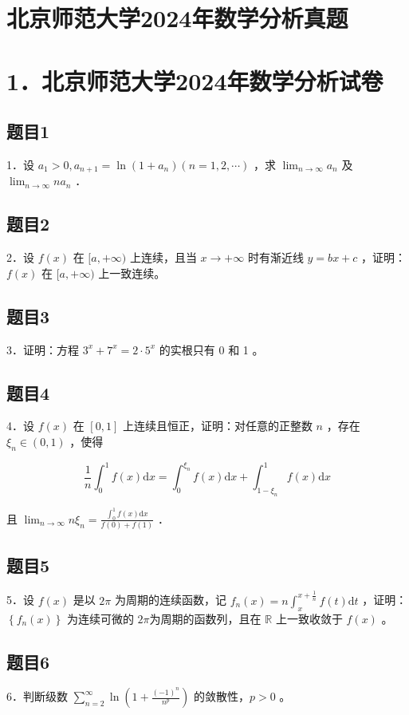 \documentclass{article}
\begin{document}
\section*{北京师范大学2024年数学分析真题}
\section*{1．北京师范大学2024年数学分析试卷}

\subsection{题目1}
1．设 \(a_{1}>0, a_{n+1}=\ln \left(1+a_{n}\right)(n=1,2, \cdots)\) ，求 \(\lim _{n \rightarrow \infty} a_{n}\) 及 \(\lim _{n \rightarrow \infty} n a_{n}\) ．

\subsection{题目2}
2．设 \(f(x)\) 在 \([a,+\infty)\) 上连续，且当 \(x \rightarrow+\infty\) 时有渐近线 \(y=b x+c\) ，证明：\(f(x)\) 在 \([a,+\infty)\) 上一致连续。

\subsection{题目3}
3．证明：方程 \(3^{x}+7^{x}=2 \cdot 5^{x}\) 的实根只有 0 和 1 。

\subsection{题目4}
4．设 \(f(x)\) 在 \([0,1]\) 上连续且恒正，证明：对任意的正整数 \(n\) ，存在 \(\xi_{n} \in(0,1)\) ，使得

\[
\frac{1}{n} \int_{0}^{1} f(x) \mathrm{d} x=\int_{0}^{\xi_{n}} f(x) \mathrm{d} x+\int_{1-\xi_{n}}^{1} f(x) \mathrm{d} x
\]

且 \(\lim _{n \rightarrow \infty} n \xi_{n}=\frac{\int_{0}^{1} f(x) \mathrm{d} x}{f(0)+f(1)}\) ．

\subsection{题目5}
5．设 \(f(x)\) 是以 \(2 \pi\) 为周期的连续函数，记 \(f_{n}(x)=n \int_{x}^{x+\frac{1}{n}} f(t) \mathrm{d} t\) ，证明：\(\left\{f_{n}(x)\right\}\) 为连续可微的 \(2 \pi\)为周期的函数列，且在 \(\mathbb{R}\) 上一致收敛于 \(f(x)\) 。

\subsection{题目6}
6．判断级数 \(\sum_{n=2}^{\infty} \ln \left(1+\frac{(-1)^{n}}{n^{p}}\right)\) 的敛散性，\(p>0\) 。
\end{document}
